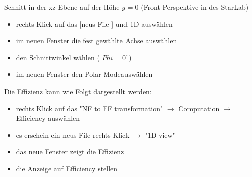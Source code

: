 \begin{itemize}
\begin{itemize}
	\end{itemize}
	Schnitt  in der xz Ebene auf der Höhe $y=0$ (Front  Perspektive in des StarLab)
	\begin{itemize}
	\item rechts Klick auf das [neus File ]  und \glqq 1D \grqq auswählen
	\item im neuen Fenster die fest gewählte Achse auswählen 
	\item den Schnittwinkel wählen ( $Phi= 0^\circ$)
	\item im neuen Fenster den \glqq Polar Mode\grqq auswählen
	\end{itemize}
	Die Effizienz kann wie Folgt dargestellt werden:
	\begin{itemize}
	\item  rechts Klick auf das "NF to FF transformation"  $\rightarrow$ Computation $\rightarrow$ Efficiency auswählen
	\item es erschein ein neus File rechts Klick  $\rightarrow$ "1D view"
	\item das neue Fenster zeigt die Effizienz 
	\item die Anzeige auf Efficiency stellen
	\end{itemize}
	
\end{itemize}



